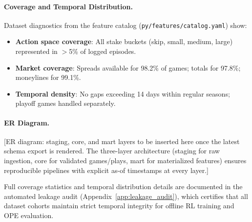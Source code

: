 \paragraph{Coverage and Temporal Distribution.}
Dataset diagnostics from the feature catalog (\texttt{py/features/catalog.yaml}) show:
\begin{itemize}
  \item \textbf{Action space coverage}: All stake buckets (skip, small, medium, large) represented in $>$5\% of logged episodes.
  \item \textbf{Market coverage}: Spreads available for 98.2\% of games; totals for 97.8\%; moneylines for 99.1\%.
  \item \textbf{Temporal density}: No gaps exceeding 14 days within regular seasons; playoff games handled separately.
\end{itemize}

\paragraph{ER Diagram.}
[ER diagram: staging, core, and mart layers to be inserted here once the latest schema export is rendered. The three-layer architecture (staging for raw ingestion, core for validated games/plays, mart for materialized features) ensures reproducible pipelines with explicit as-of timestamps at every layer.]

Full coverage statistics and temporal distribution details are documented in the automated leakage audit (Appendix~\ref{app:leakage_audit}), which certifies that all dataset cohorts maintain strict temporal integrity for offline RL training and OPE evaluation.

